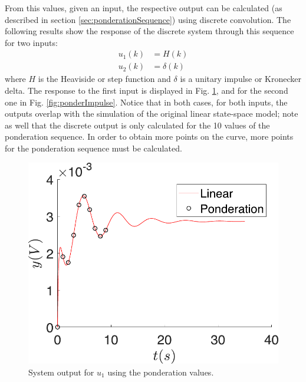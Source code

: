 From this values, given an input, the respective output can be calculated (as described in section \ref{sec:ponderationSequence}) using discrete convolution. The following results show the response of the discrete system through this sequence for two inputs:
\begin{align}
    u_1(k)&=H(k)\\
    u_2(k)&=\delta(k)
\end{align}
where $H$ is the Heaviside or step function and $\delta$ is a unitary impulse or Kronecker delta. The response to the first input is displayed in Fig. \ref{fig:ponderStep}, and for the second one in Fig. \ref{fig:ponderImpulse}. Notice that in both cases, for both inputs, the outputs overlap with the simulation of the original linear state-space model; note as well that the discrete output is only calculated for the 10 values of the ponderation sequence. In order to obtain more points on the curve, more points for the ponderation sequence must be calculated.
\begin{figure}[ht]
    \centering
    \includegraphics[scale=0.5]{figs/pondrtion/Comp_ponderation_linear.pdf}
    \caption{System output for $u_1$ using the ponderation values.}
    \label{fig:ponderStep}
\end{figure}
